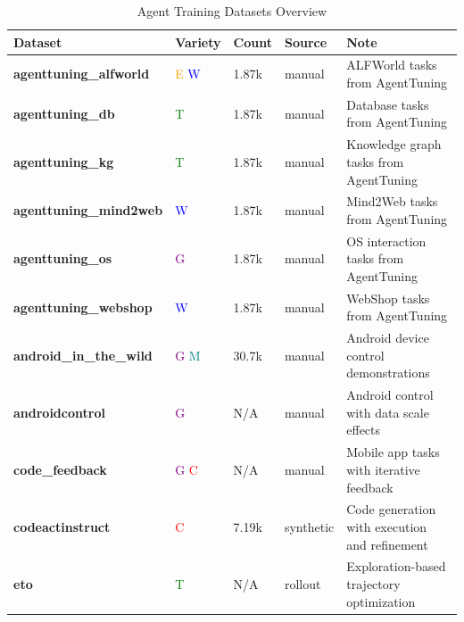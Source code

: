 
\begin{table}[htbp]
\centering
\caption{Agent Training Datasets Overview}
\label{tab:agent-datasets}
\begin{tabular}{p{3cm}p{2cm}p{1.5cm}p{1.5cm}p{4cm}}
\toprule
\textbf{Dataset} & \textbf{Variety} & \textbf{Count} & \textbf{Source} & \textbf{Note} \\
\midrule
\textbf{agenttuning\_alfworld} \cite{agenttuning_enabling_2310_12823} & \textcolor{orange}{E} \textcolor{blue}{W} & 1.87k & manual & ALFWorld tasks from AgentTuning \\
\textbf{agenttuning\_db} \cite{agenttuning_enabling_2310_12823} & \textcolor{green}{T} & 1.87k & manual & Database tasks from AgentTuning \\
\textbf{agenttuning\_kg} \cite{agenttuning_enabling_2310_12823} & \textcolor{green}{T} & 1.87k & manual & Knowledge graph tasks from AgentTuning \\
\textbf{agenttuning\_mind2web} \cite{agenttuning_enabling_2310_12823} & \textcolor{blue}{W} & 1.87k & manual & Mind2Web tasks from AgentTuning \\
\textbf{agenttuning\_os} \cite{agenttuning_enabling_2310_12823} & \textcolor{purple}{G} & 1.87k & manual & OS interaction tasks from AgentTuning \\
\textbf{agenttuning\_webshop} \cite{agenttuning_enabling_2310_12823} & \textcolor{blue}{W} & 1.87k & manual & WebShop tasks from AgentTuning \\
\textbf{android\_in\_the\_wild} \cite{android_in_the_wild__2307_10088} & \textcolor{purple}{G} \textcolor{teal}{M} & 30.7k & manual & Android device control demonstrations \\
\textbf{androidcontrol} \cite{on_the_effects_of_da_2406_03679} & \textcolor{purple}{G} & N/A & manual & Android control with data scale effects \\
\textbf{code\_feedback} \cite{mobile_app_tasks_wit_2104_08560} & \textcolor{purple}{G} \textcolor{red}{C} & N/A & manual & Mobile app tasks with iterative feedback \\
\textbf{codeactinstruct} \cite{opencodeinterpreter__2402_14658} & \textcolor{red}{C} & 7.19k & synthetic & Code generation with execution and refinement \\
\textbf{eto} \cite{trial_and_error_expl_2403_02502} & \textcolor{green}{T} & N/A & rollout & Exploration-based trajectory optimization \\

\end{tabular}
\end{table}
